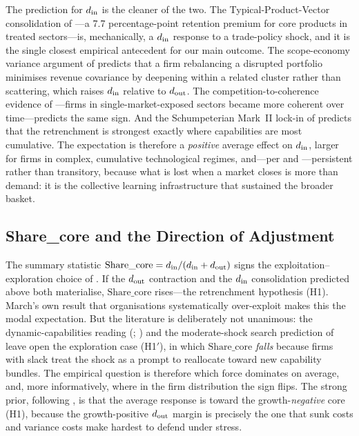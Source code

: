 The prediction for $d_{\rm in}$ is the cleaner of the two. The Typical-Product-Vector
consolidation of \citet{fontagne2018}---a 7.7 percentage-point retention premium for
core products in treated sectors---is, mechanically, a $d_{\rm in}$ response to a
trade-policy shock, and it is the single closest empirical antecedent for our main
outcome. The scope-economy variance argument of \citet{bottazzi2006} predicts that a
firm rebalancing a disrupted portfolio minimises revenue covariance by deepening within
a related cluster rather than scattering, which raises $d_{\rm in}$ relative to
$d_{\rm out}$. The competition-to-coherence evidence of \citet{valvano2003}---firms in
single-market-exposed sectors became more coherent over time---predicts the same sign.
And the Schumpeterian Mark~II lock-in of \citet{dosi1995} predicts that the retrenchment
is strongest exactly where capabilities are most cumulative. The expectation is
therefore a \emph{positive} average effect on $d_{\rm in}$, larger for firms in
complex, cumulative technological regimes, and---per \citet{storper1992} and
\citet{riverabatiz1991}---persistent rather than transitory, because what is lost when
a market closes is more than demand: it is the collective learning infrastructure that
sustained the broader basket.

\subsection{Share\_core and the Direction of Adjustment}
\label{subsec:exp_share}

The summary statistic $\text{Share\_core} = d_{\rm in}/(d_{\rm in}+d_{\rm out})$ signs
the exploitation--exploration choice of \citet{march1991}. If the $d_{\rm out}$
contraction and the $d_{\rm in}$ consolidation predicted above both materialise,
$\text{Share\_core}$ rises---the retrenchment hypothesis (H1). March's own result that
organisations systematically over-exploit makes this the modal expectation. But the
literature is deliberately not unanimous: the dynamic-capabilities reading
(\citealp{penrose1959}; \citealp{teece1982}) and the moderate-shock search prediction
of \citet{matsusaka2001} leave open the exploration case (H1$'$), in which $\text{Share\_core}$
\emph{falls} because firms with slack treat the shock as a prompt to reallocate toward
new capability bundles. The empirical question is therefore which force dominates on
average, and, more informatively, where in the firm distribution the sign flips. The
strong prior, following \citet{destefano2025}, is that the average response is toward
the growth-\emph{negative} core (H1), because the growth-positive $d_{\rm out}$ margin
is precisely the one that sunk costs and variance costs make hardest to defend under
stress.

